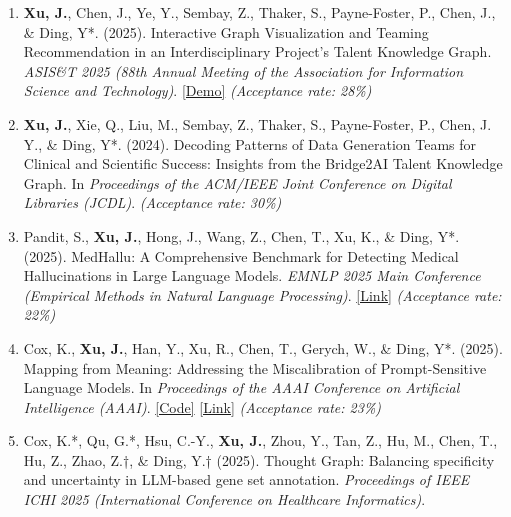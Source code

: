 \documentclass[a4paper,9pt]{extarticle}
\begin{document}
\vspace{0.2cm}
\begin{enumerate}[resume,leftmargin=0.8cm]


    \item \textbf{Xu, J.}, Chen, J., Ye, Y., Sembay, Z., Thaker, S., Payne-Foster, P., Chen, J., \& Ding, Y*. (2025). Interactive Graph Visualization and Teaming Recommendation in an Interdisciplinary Project's Talent Knowledge Graph. \textit{ASIS\&T 2025 (88th Annual Meeting of the Association for Information Science and Technology)}. \href{https://cm4aikg.vercel.app/}{[Demo]} \textit{(Acceptance rate: 28\%)}
    \vspace{.2cm}
    
    \item \textbf{Xu, J.}, Xie, Q., Liu, M., Sembay, Z., Thaker, S., Payne-Foster, P., Chen, J. Y., \& Ding, Y*. (2024). Decoding Patterns of Data Generation Teams for Clinical and Scientific Success: Insights from the Bridge2AI Talent Knowledge Graph. In \textit{Proceedings of the ACM/IEEE Joint Conference on Digital Libraries (JCDL)}. \textit{(Acceptance rate: 30\%)}
    \vspace{.2cm}
    
    \item Pandit, S., \textbf{Xu, J.}, Hong, J., Wang, Z., Chen, T., Xu, K., \& Ding, Y*. (2025). MedHallu: A Comprehensive Benchmark for Detecting Medical Hallucinations in Large Language Models. \textit{EMNLP 2025 Main Conference (Empirical Methods in Natural Language Processing)}. \href{https://arxiv.org/abs/2502.14302}{[Link]} \textit{(Acceptance rate: 22\%)}
    \vspace{.2cm}

    \item Cox, K., \textbf{Xu, J.}, Han, Y., Xu, R., Chen, T., Gerych, W., \& Ding, Y*. (2025). Mapping from Meaning: Addressing the Miscalibration of Prompt-Sensitive Language Models. In \textit{Proceedings of the AAAI Conference on Artificial Intelligence (AAAI)}. \href{https://github.com/xocelyk/paraphrase-uncertainty}{[Code]} \href{https://ojs.aaai.org/index.php/AAAI/article/view/34540}{[Link]} \textit{(Acceptance rate: 23\%)}
    \vspace{.2cm}

    \item Cox, K.*, Qu, G.*, Hsu, C.-Y., \textbf{Xu, J.}, Zhou, Y., Tan, Z., Hu, M., Chen, T., Hu, Z., Zhao, Z.†, \& Ding, Y.† (2025). Thought Graph: Balancing specificity and uncertainty in LLM-based gene set annotation. \textit{Proceedings of IEEE ICHI 2025 (International Conference on Healthcare Informatics)}.
    \vspace{.2cm}


\end{enumerate}
\end{document}
